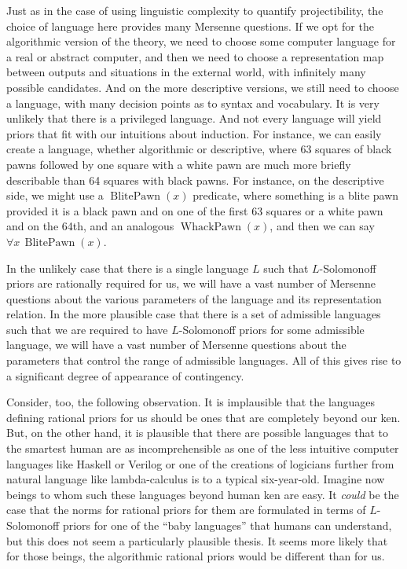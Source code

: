 Just as in the case of using linguistic complexity to quantify projectibility, the choice of language here provides many Mersenne
questions. If we opt for the algorithmic version of the theory, we need to choose some computer language for a real or abstract
computer, and then we need to choose a representation map between outputs and situations in the external world, with infinitely
many possible candidates. And on the more
descriptive versions, we still need to choose a language, with many decision points as to syntax and vocabulary. It is very unlikely 
that there is a privileged language. And not
every language will yield priors that fit with our intuitions about induction. For instance, we can easily create a language, whether algorithmic or descriptive,
where 63 squares of black pawns followed by one square with a white pawn are much more briefly describable than 64 squares with
black pawns. For instance, on the descriptive side, we might use a $\operatorname{BlitePawn}(x)$ predicate, where something is a blite pawn 
provided it is a black pawn and on one of the first 63 squares or a white pawn and on the 64th, and an analogous $\operatorname{WhackPawn}(x)$, and then we can say $\forall x\, \operatorname{BlitePawn}(x)$.

In the unlikely case that there is a single language $L$ such that $L$-Solomonoff priors are rationally required for us,
we will have a vast number of Mersenne questions about the various parameters of the language and its representation relation.
In the more plausible case that there is a set of admissible languages such that we are required to have $L$-Solomonoff priors for some admissible language, we will have a vast number of Mersenne questions about the parameters that control the range of admissible languages. All of this
gives rise to a significant degree of appearance of contingency.

Consider, too, the following observation. It is implausible that the languages defining rational priors for us
should be ones that are completely beyond our ken. But, on the other hand, it is plausible that there are possible
languages that to the smartest human are as incomprehensible as one of the less intuitive computer languages like
Haskell or Verilog or one of the creations of logicians further from natural language like lambda-calculus is to a typical
six-year-old. Imagine now beings to whom such these languages beyond human ken are easy. It \textit{could} be the case that
the norms for rational priors for them are formulated in terms of $L$-Solomonoff priors for one of the ``baby languages''
that humans can understand, but this does not seem a particularly plausible thesis. It seems more likely that for those
beings, the algorithmic rational priors would be different than for us. 

